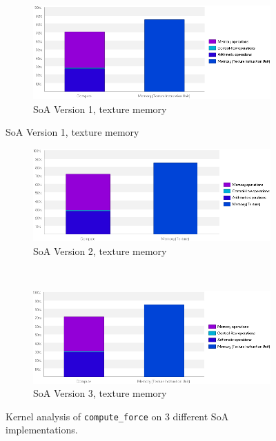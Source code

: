 \documentclass[12pt, a4paper]{article}
\begin{document}
\begin{figure}[ht]
  \centering
  \begin{subfigure}{\textwidth}
    \centering
    \includegraphics[width=\textwidth]{images/soa_v1_global_mem.png}
    \caption{SoA Version 1, texture memory}
  \end{subfigure}
\end{figure}
\begin{figure}[ht]\ContinuedFloat
  \centering
  \begin{subfigure}{.95\textwidth}
    \centering
    \includegraphics[width=\textwidth]{images/soa_v2_global_mem.png}
    \caption{SoA Version 2, texture memory}
    \label{figure:soa_v2_global_mem}
  \end{subfigure}\\ \bigskip
  \begin{subfigure}{.95\textwidth}
    \centering
    \includegraphics[width=\textwidth]{images/soa_v3_global_mem.png}
    \caption{SoA Version 3, texture memory}
  \end{subfigure}
  \caption{Kernel analysis of \texttt{compute\_force} on 3 different SoA implementations.}
  \label{figure:soa_layout}
\end{figure}
\end{document}
